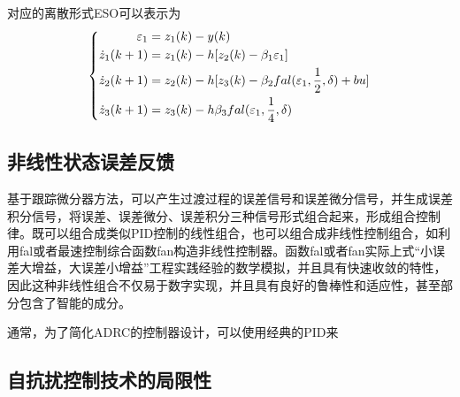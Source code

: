 对应的离散形式ESO可以表示为
\begin{equation}
\centering
\label{}
\left\{ \begin{aligned}
\varepsilon _1 &= z_1(k) - y(k)\\
\dot z_1(k+1) &= z_1(k) - h[z_2(k)-\beta_1\varepsilon_1]\\
\dot z_2(k+1) &= z_2(k) - h[z_3(k)-\beta_2fal(\varepsilon_1,\frac{1}{2},\delta) + bu]\\
\dot z_3(k+1) &= z_3(k)-h\beta_3fal(\varepsilon_1,\frac{1}{4},\delta)
\end{aligned} \right.
\end{equation}
\subsection{非线性状态误差反馈}
基于跟踪微分器方法，可以产生过渡过程的误差信号和误差微分信号，并生成误差积分信号，将误差、误差微分、误差积分三种信号形式组合起来，形成组合控制律。既可以组合成类似PID控制的线性组合，也可以组合成非线性控制组合，如利用fal或者最速控制综合函数fan构造非线性控制器。函数fal或者fan实际上式“小误差大增益，大误差小增益”工程实践经验的数学模拟，并且具有快速收敛的特性，因此这种非线性组合不仅易于数字实现，并且具有良好的鲁棒性和适应性，甚至部分包含了智能的成分。

通常，为了简化ADRC的控制器设计，可以使用经典的PID来

\subsection{自抗扰控制技术的局限性}